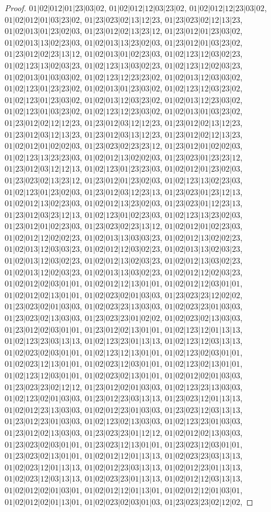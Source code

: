 \documentclass[12pt]{article}
\theoremstyle{plain}
\theoremstyle{definition}
\theoremstyle{remark}
\begin{document}
\begin{proof}
$01|02|012|01|23|03|02$, $01|02|012|12|03|23|02$, $01|02|012|12|23|03|02$, $01|02|012|01|03|23|02$, $01|23|023|02|13|12|23$, $01|23|023|02|12|13|23$, $01|02|013|01|23|02|03$, $01|23|012|02|13|23|12$, $01|23|012|01|23|03|02$, $01|02|013|13|02|23|03$, $01|02|013|13|23|02|03$, $01|23|012|01|03|23|02$, $01|23|012|02|23|13|12$, $01|02|013|01|02|23|03$, $01|02|123|12|03|02|23$, $01|02|123|13|02|03|23$, $01|02|123|13|03|02|23$, $01|02|123|12|02|03|23$, $01|02|013|01|03|03|02$, $01|02|123|12|23|23|02$, $01|02|013|12|03|03|02$, $01|02|123|01|23|23|02$, $01|02|013|01|23|03|02$, $01|02|123|12|03|23|02$, $01|02|123|01|23|03|02$, $01|02|013|12|03|23|02$, $01|02|013|12|23|03|02$, $01|02|123|01|03|23|02$, $01|02|123|12|23|03|02$, $01|02|013|01|03|23|02$, $01|23|012|02|12|12|23$, $01|23|012|03|12|12|23$, $01|23|012|02|13|12|23$, $01|23|012|03|12|13|23$, $01|23|012|03|13|12|23$, $01|23|012|02|12|13|23$, $01|02|012|01|02|02|03$, $01|23|023|02|23|23|12$, $01|23|012|01|02|02|03$, $01|02|123|13|23|23|03$, $01|02|012|13|02|02|03$, $01|23|023|01|23|23|12$, $01|23|012|03|12|12|13$, $01|02|123|01|23|23|03$, $01|02|012|01|23|02|03$, $01|23|023|02|13|23|12$, $01|23|012|01|23|02|03$, $01|02|123|13|02|23|03$, $01|02|123|01|23|02|03$, $01|23|012|03|12|23|13$, $01|23|023|01|23|12|13$, $01|02|012|13|02|23|03$, $01|02|012|13|23|02|03$, $01|23|023|01|12|23|13$, $01|23|012|03|23|12|13$, $01|02|123|01|02|23|03$, $01|02|123|13|23|02|03$, $01|23|012|01|02|23|03$, $01|23|023|02|23|13|12$, $01|02|012|01|02|23|03$, $01|02|012|12|02|02|23$, $01|02|013|13|03|03|23$, $01|02|012|13|02|02|23$, $01|02|013|12|03|03|23$, $01|02|012|12|03|02|23$, $01|02|013|13|02|03|23$, $01|02|013|12|03|02|23$, $01|02|012|13|02|03|23$, $01|02|012|13|03|02|23$, $01|02|013|12|02|03|23$, $01|02|013|13|03|02|23$, $01|02|012|12|02|03|23$, $01|02|012|02|03|01|01$, $01|02|012|12|13|01|01$, $01|02|012|12|03|01|01$, $01|02|012|02|13|01|01$, $01|02|023|02|01|03|03$, $01|23|023|23|12|02|02$, $01|23|023|02|01|03|03$, $01|02|023|23|13|03|03$, $01|02|023|23|01|03|03$, $01|23|023|02|13|03|03$, $01|23|023|23|01|02|02$, $01|02|023|02|13|03|03$, $01|23|012|02|03|01|01$, $01|23|012|02|13|01|01$, $01|02|123|12|01|13|13$, $01|02|123|23|03|13|13$, $01|02|123|23|01|13|13$, $01|02|123|12|03|13|13$, $01|02|023|02|03|01|01$, $01|02|123|12|13|01|01$, $01|02|123|02|03|01|01$, $01|02|023|12|13|01|01$, $01|02|023|12|03|01|01$, $01|02|123|02|13|01|01$, $01|02|123|12|03|01|01$, $01|02|023|02|13|01|01$, $01|02|012|02|01|03|03$, $01|23|023|23|02|12|12$, $01|23|012|02|01|03|03$, $01|02|123|23|13|03|03$, $01|02|123|02|01|03|03$, $01|23|012|23|03|13|13$, $01|23|023|12|01|13|13$, $01|02|012|23|13|03|03$, $01|02|012|23|01|03|03$, $01|23|023|12|03|13|13$, $01|23|012|23|01|03|03$, $01|02|123|02|13|03|03$, $01|02|123|23|01|03|03$, $01|23|012|02|13|03|03$, $01|23|023|23|01|12|12$, $01|02|012|02|13|03|03$, $01|23|023|02|03|01|01$, $01|23|023|12|13|01|01$, $01|23|023|12|03|01|01$, $01|23|023|02|13|01|01$, $01|02|012|12|01|13|13$, $01|02|023|23|03|13|13$, $01|02|023|12|01|13|13$, $01|02|012|23|03|13|13$, $01|02|012|23|01|13|13$, $01|02|023|12|03|13|13$, $01|02|023|23|01|13|13$, $01|02|012|12|03|13|13$, $01|02|012|02|01|03|01$, $01|02|012|12|01|13|01$, $01|02|012|12|01|03|01$, $01|02|012|02|01|13|01$, $01|02|023|02|03|01|03$, $01|23|023|23|02|12|02$, 
\end{proof}
\end{document}
